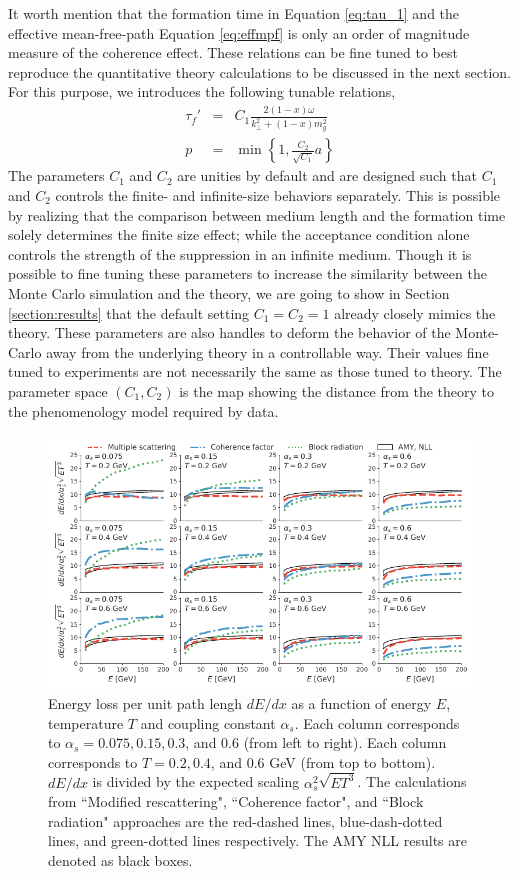 \documentclass[aps, prc, reprint, amsmath, groupedaddress, nofootinbib]{revtex4-1}
\begin{document}
It worth mention that the formation time in Equation \ref{eq:tau_1} and the effective mean-free-path Equation \ref{eq:effmpf} is only an order of magnitude measure of the coherence effect. 
These relations can be fine tuned to best reproduce the quantitative theory calculations to be discussed in the next section.
For this purpose, we introduces the following tunable relations,
\begin{eqnarray}\label{eq:tune}
\nonumber
\tau_f' &=& C_1 \frac{2(1-x)\omega}{k_\perp^2+(1-x)m_g^2} \\
p &=& \min\left\{1, \frac{C_2}{\sqrt{C_1}} a\right\}
\end{eqnarray}
The parameters $C_1$ and $C_2$ are unities by default and are designed such that $C_1$ and $C_2$ controls the finite- and infinite-size behaviors separately. 
This is possible by realizing that the comparison between medium length and the formation time solely determines the finite size effect; while the acceptance condition alone controls the strength of the suppression in an infinite medium.
Though it is possible to fine tuning these parameters to increase the similarity between the Monte Carlo simulation and the theory, we are going to show in Section \ref{section:results} that the default setting $C_1 = C_2 = 1$ already closely mimics the theory.
These parameters are also handles to deform the behavior of the Monte-Carlo away from the underlying theory in a controllable way.
Their values fine tuned to experiments are not necessarily the same as those tuned to theory. 
The parameter space $(C_1, C_2)$ is the map showing the distance from the theory to the phenomenology model required by data.

\begin{figure}
\includegraphics[width=\textwidth]{Eloss_infinite.pdf}
\caption{Energy loss per unit path lengh $dE/dx$ as a function of energy $E$, temperature $T$ and coupling constant $\alpha_s$. Each column corresponds to $\alpha_s = 0.075, 0.15, 0.3$, and $0.6$ (from left to right). Each column corresponds to $T = 0.2, 0.4$, and $0.6$ GeV (from top to bottom). $dE/dx$ is divided by the expected scaling $\alpha_s^2 \sqrt{ET^3}$. The calculations from ``Modified rescattering", ``Coherence factor", and ``Block radiation" approaches are the red-dashed lines, blue-dash-dotted lines, and green-dotted lines respectively. The AMY NLL results are denoted as black boxes.}
\label{fig:eloss-inf}
\end{figure}
\end{document}
